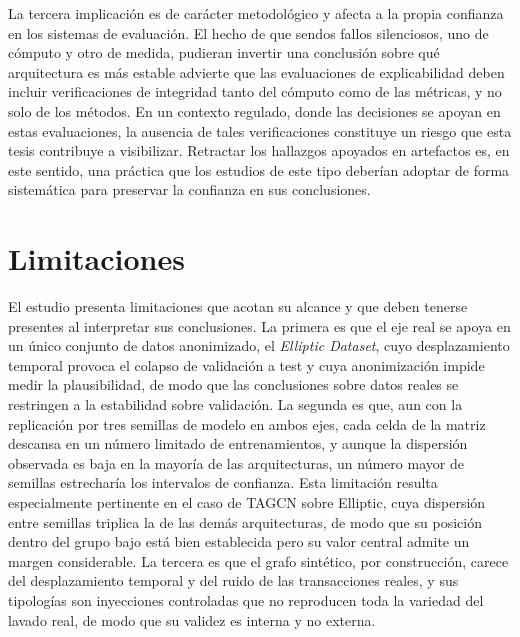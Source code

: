La tercera implicación es de carácter metodológico y afecta a la propia confianza en los sistemas de evaluación. El hecho de que sendos fallos silenciosos, uno de cómputo y otro de medida, pudieran invertir una conclusión sobre qué arquitectura es más estable advierte que las evaluaciones de explicabilidad deben incluir verificaciones de integridad tanto del cómputo como de las métricas, y no solo de los métodos. En un contexto regulado, donde las decisiones se apoyan en estas evaluaciones, la ausencia de tales verificaciones constituye un riesgo que esta tesis contribuye a visibilizar. Retractar los hallazgos apoyados en artefactos es, en este sentido, una práctica que los estudios de este tipo deberían adoptar de forma sistemática para preservar la confianza en sus conclusiones.



\section{Limitaciones}

El estudio presenta limitaciones que acotan su alcance y que deben tenerse presentes al interpretar sus conclusiones. La primera es que el eje real se apoya en un único conjunto de datos anonimizado, el \textit{Elliptic Dataset}, cuyo desplazamiento temporal provoca el colapso de validación a test y cuya anonimización impide medir la plausibilidad, de modo que las conclusiones sobre datos reales se restringen a la estabilidad sobre validación. La segunda es que, aun con la replicación por tres semillas de modelo en ambos ejes, cada celda de la matriz descansa en un número limitado de entrenamientos, y aunque la dispersión observada es baja en la mayoría de las arquitecturas, un número mayor de semillas estrecharía los intervalos de confianza. Esta limitación resulta especialmente pertinente en el caso de TAGCN sobre Elliptic, cuya dispersión entre semillas triplica la de las demás arquitecturas, de modo que su posición dentro del grupo bajo está bien establecida pero su valor central admite un margen considerable. La tercera es que el grafo sintético, por construcción, carece del desplazamiento temporal y del ruido de las transacciones reales, y sus tipologías son inyecciones controladas que no reproducen toda la variedad del lavado real, de modo que su validez es interna y no externa.

